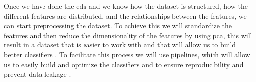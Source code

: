 Once we have done the \ac{eda} and we know how the dataset is structured, how the different features are distributed, and the relationships between the features, we can start preprocessing the dataset. To achieve this we will standardize the features and then reduce the dimensionality of the features by using \ac{pca}, this will result in a dataset that is easier to work with and that will allow us to build better classifiers \cite{dinc_evaluation_2014}. To facilitate this process we will use pipelines, which will allow us to easily build and optimize the classifiers and to ensure reproducibility and prevent data leakage \cite{zhao_pre-process_2019}.

